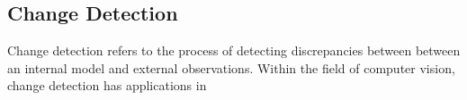 \subsection{Change Detection}

Change detection refers to the process of detecting discrepancies between between an internal model and external observations. Within the field of computer vision, change detection has applications in 